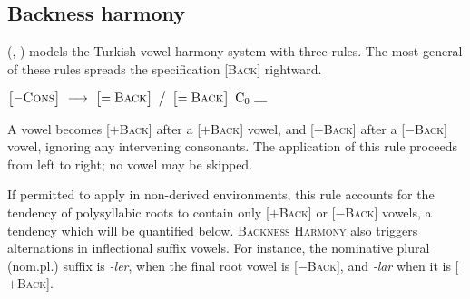 \subsection{Backness harmony}

\citeauthor{Lees1966b} (\citeyear[35]{Lees1966b}, \citeyear[284]{Lees1966a}) models the Turkish vowel harmony system with three rules. The most general of these rules spreads the specification [\textsc{Back}] rightward.

\begin{example}
$\begin{bmatrix} -\textsc{Cons} \end{bmatrix}~\goesto~\begin{bmatrix} =\textsc{Back} \end{bmatrix}~\big /~\begin{bmatrix} =\textsc{Back} \end{bmatrix}~\textrm{C}_0~\gap$
\end{example}

\noindent
A vowel becomes [$+$\textsc{Back}] after a [$+$\textsc{Back}] vowel, and [$-$\textsc{Back}] after a [$-$\textsc{Back}] vowel, ignoring any intervening consonants. The application of this rule proceeds from left to right; no vowel may be skipped.

If permitted to apply in non-derived environments, this rule accounts for the tendency of polysyllabic roots to contain only [$+$\textsc{Back}] or [$-$\textsc{Back}] vowels, a tendency which will be quantified below. \textsc{Backness Harmony} also triggers alternations in inflectional suffix vowels. For instance, the nominative plural (nom.pl.) suffix is \emph{-ler}, when the final root vowel is [$-$\textsc{Back}], and \emph{-lar} when it is [$+$\textsc{Back}].

